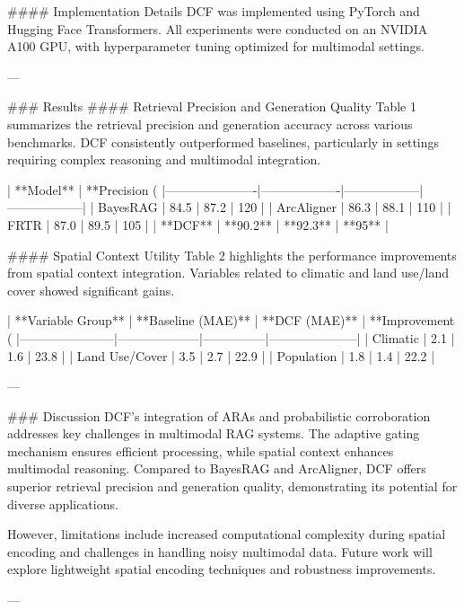 #### Implementation Details
DCF was implemented using PyTorch and Hugging Face Transformers. All experiments were conducted on an NVIDIA A100 GPU, with hyperparameter tuning optimized for multimodal settings.

---

### Results
#### Retrieval Precision and Generation Quality
Table 1 summarizes the retrieval precision and generation accuracy across various benchmarks. DCF consistently outperformed baselines, particularly in settings requiring complex reasoning and multimodal integration.

| **Model**           | **Precision (%
|----------------------|-------------------|------------------|------------------|
| BayesRAG            | 84.5             | 87.2             | 120              |
| ArcAligner          | 86.3             | 88.1             | 110              |
| FRTR                | 87.0             | 89.5             | 105              |
| **DCF**             | **90.2**         | **92.3**         | **95**           |

#### Spatial Context Utility
Table 2 highlights the performance improvements from spatial context integration. Variables related to climatic and land use/land cover showed significant gains.

| **Variable Group**   | **Baseline (MAE)** | **DCF (MAE)** | **Improvement (%
|-----------------------|--------------------|---------------|---------------------|
| Climatic             | 2.1                | 1.6           | 23.8               |
| Land Use/Cover       | 3.5                | 2.7           | 22.9               |
| Population           | 1.8                | 1.4           | 22.2               |

---

### Discussion
DCF's integration of ARAs and probabilistic corroboration addresses key challenges in multimodal RAG systems. The adaptive gating mechanism ensures efficient processing, while spatial context enhances multimodal reasoning. Compared to BayesRAG and ArcAligner, DCF offers superior retrieval precision and generation quality, demonstrating its potential for diverse applications.

However, limitations include increased computational complexity during spatial encoding and challenges in handling noisy multimodal data. Future work will explore lightweight spatial encoding techniques and robustness improvements.

---

